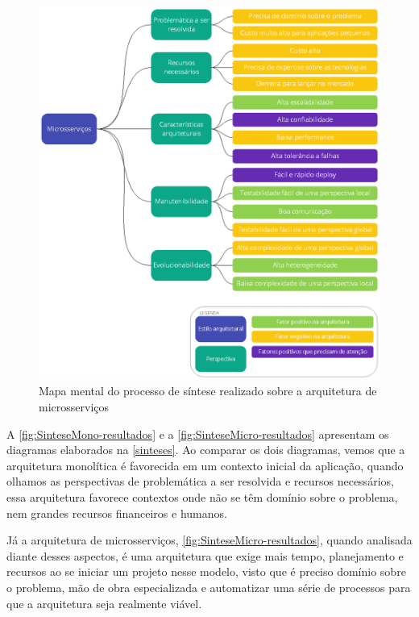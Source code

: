 \begin{figure}[h]
  \centering
  \includegraphics[keepaspectratio=true,scale=1]{figuras/sintese-microsservicos.eps}
  \caption{Mapa mental do processo de síntese realizado sobre a arquitetura de microsserviços\label{fig:SinteseMicro-resultados}}
\end{figure}

A \autoref{fig:SinteseMono-resultados} e a \autoref{fig:SinteseMicro-resultados} apresentam os
diagramas elaborados na \autoref{sinteses}. Ao comparar os dois diagramas, vemos que a arquitetura
monolítica é favorecida em um contexto inicial da aplicação, quando olhamos as perspectivas de
problemática a ser resolvida e recursos necessários, essa arquitetura favorece contextos onde não se
têm domínio sobre o problema, nem grandes recursos financeiros e humanos.

Já a arquitetura de microsserviços, \autoref{fig:SinteseMicro-resultados}, quando analisada diante
desses aspectos, é uma arquitetura que exige mais tempo, planejamento e recursos ao se iniciar um
projeto nesse modelo, visto que é preciso domínio sobre o problema, mão de obra especializada e
automatizar uma série de processos para que a arquitetura seja realmente viável.

